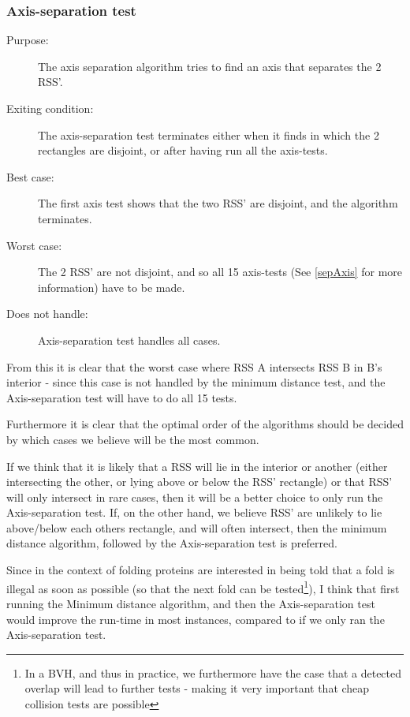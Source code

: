 \subsubsection{Axis-separation test}
\begin{description}
\item[Purpose:] The axis separation algorithm tries to find an axis that separates the 2 RSS'. 
\item[Exiting condition:] The axis-separation test terminates either when it finds in which the 2 rectangles are disjoint, or after having run all the axis-tests.
\item[Best case:] The first axis test shows that the two RSS' are disjoint, and the algorithm terminates. 
\item[Worst case:] The 2 RSS' are not disjoint, and so all 15 axis-tests (See \ref{sepAxis} for more information) have to be made.
\item[Does not handle:] Axis-separation test handles all cases.
\end{description}

From this it is clear that the worst case where RSS A intersects RSS B in B's interior - since this case is not handled by the minimum distance test, and the Axis-separation test will have to do all 15 tests.

Furthermore it is clear that the optimal order of the algorithms should be decided by which cases we believe will be the most common. 

If we think that it is likely that a RSS will lie in the interior or another (either intersecting the other, or lying above or below the RSS' rectangle) or that RSS' will only intersect in rare cases, then it will be a better choice to only run the Axis-separation test. If, on the other hand, we believe RSS' are unlikely to lie above/below each others rectangle, and will often intersect, then the minimum distance algorithm, followed by the Axis-separation test is preferred.

Since in the context of folding proteins are interested in being told that a fold is illegal as soon as possible (so that the next fold can be tested\footnote{In a BVH, and thus in practice, we furthermore have the case that a detected overlap will lead to further tests - making it very important that cheap collision tests are possible}), I think that first running the Minimum distance algorithm, and then the Axis-separation test would improve the run-time in most instances, compared to if we only ran the Axis-separation test.


